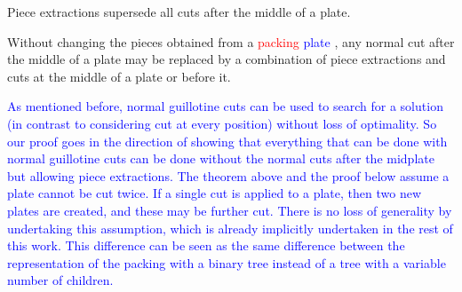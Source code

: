 \documentclass[ppgc,tese,english,formais,babel]{iiufrgs}
\newif\iffinalversion
\newcommand{\newtext}[1]{\iffinalversion%
#1%
\else%
\textcolor{blue}{#1}%
\fi%
}
\newcommand{\oldtext}[1]{\iffinalversion%
\else%
\textcolor{red}{#1}%
\fi%
}
\begin{document}
\begin{theorem}{Piece extractions supersede all cuts after the middle of a plate.}

Without changing the pieces obtained from a \oldtext{packing}\newtext{plate}, any normal cut after the middle of a plate may be replaced by a combination of piece extractions and cuts at the middle of a plate or before it.
\label{the:enhanced_correctness}
\end{theorem}

\newtext{
As mentioned before, normal guillotine cuts can be used to search for a solution (in contrast to considering cut at every position) without loss of optimality.
So our proof goes in the direction of showing that everything that can be done with normal guillotine cuts can be done without the normal cuts after the midplate but allowing piece extractions.
The theorem above and the proof below assume a plate cannot be cut twice.
If a single cut is applied to a plate, then two new plates are created, and these may be further cut.
There is no loss of generality by undertaking this assumption, which is already implicitly undertaken in the rest of this work.
This difference can be seen as the same difference between the representation of the packing with a binary tree instead of a tree with a variable number of children.
}
\end{document}
